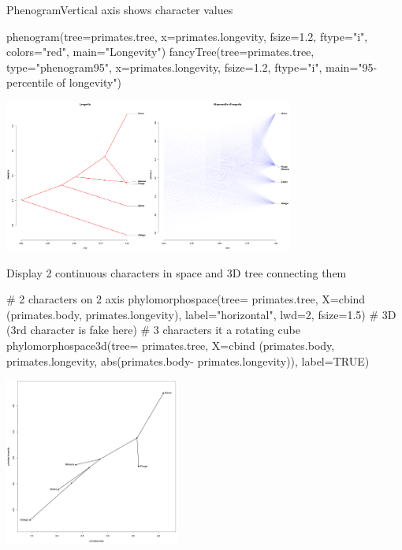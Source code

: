 \documentclass[compress, ucs, xelatex, 11pt, xcolor=svgnames,
  hyperref={
    bookmarks=true,
    unicode=true,
    colorlinks=true,
    pdftitle={Molecular data in R},
    plainpages=false,
    pdfauthor={Vojtech Zeisek},
    pdfsubject={Course about phylogeny and evolution in R},
    pdfcreator={XeLaTeX},
    pdfkeywords={R, evolution, phylogeny, molecular data},
    linkcolor=Tomato,
    anchorcolor=SaddleBrown,
    citecolor=Goldenrod,
    filecolor=DarkMagenta,
    menucolor=Sienna,
    urlcolor=DarkTurquoise,
    pdftex},
  url={hyphens, lowtilde} %
  ]{beamer}
\begin{document}
\begin{frame}[fragile]{Phenogram}{Vertical axis shows character values}
  \begin{spluscode}
    phenogram(tree=primates.tree, x=primates.longevity, fsize=1.2,
      ftype="i", colors="red", main="Longevity")
    fancyTree(tree=primates.tree, type="phenogram95", x=primates.longevity,
      fsize=1.2, ftype="i", main="95-percentile of longevity")
  \end{spluscode}
  \begin{center}
    \includegraphics[height=5cm]{phenogram.png}
  \end{center}
\end{frame}

\begin{frame}[fragile]{Display 2 continuous characters in space and 3D tree connecting them}
\begin{multicols}{2}
  \begin{spluscode}
    # 2 characters on 2 axis
    phylomorphospace(tree=
      primates.tree, X=cbind
      (primates.body,
      primates.longevity),
      label="horizontal",
      lwd=2, fsize=1.5)
    # 3D (3rd character is fake here)
    # 3 characters it a rotating cube
    phylomorphospace3d(tree=
      primates.tree, X=cbind
      (primates.body,
      primates.longevity,
      abs(primates.body-
      primates.longevity)),
      label=TRUE)
  \end{spluscode}
  \begin{center}
    \includegraphics[height=5.5cm]{phylomorphospace.png}
  \end{center}
\end{multicols}
\end{frame}
\end{document}
